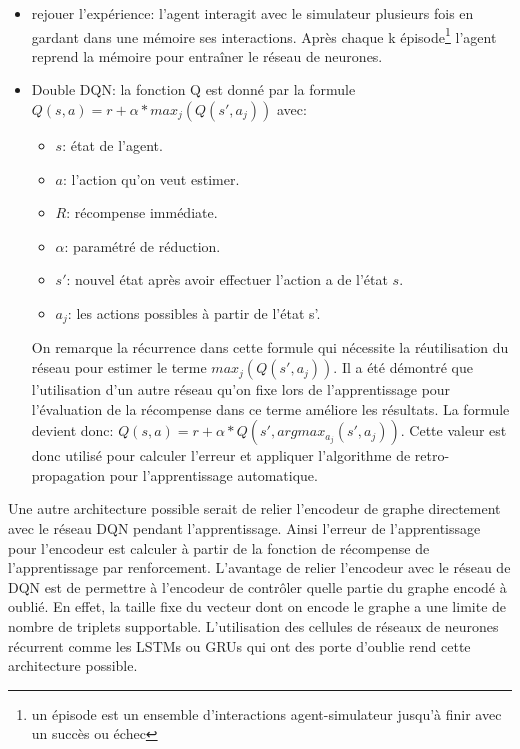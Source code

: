 \begin{itemize}
	\item rejouer l'expérience: l'agent interagit avec le simulateur plusieurs fois en gardant dans une mémoire ses interactions. Après chaque k épisode\footnote{un épisode est un ensemble d'interactions agent-simulateur jusqu'à finir avec un succès ou échec} l'agent reprend la mémoire pour entraîner le réseau de neurones.
	\item Double DQN: la fonction Q est donné par la formule $Q(s,a) = r + \alpha*max_j(Q(s',a_j))$ avec:
	\begin{itemize}
		\item $s$: état de l'agent.
		\item $a$: l'action qu'on veut estimer.
		\item $R$: récompense immédiate.
		\item $\alpha$: paramétré de réduction.
		\item $s'$: nouvel état après avoir effectuer l'action a de l'état $s$.
		\item $a_j$: les actions possibles à partir de l'état s'.
	\end{itemize}
	On remarque la récurrence dans cette formule qui nécessite la réutilisation du réseau pour estimer le terme $max_j (Q(s',a_j))$. Il a été démontré que l'utilisation d'un autre réseau qu'on fixe lors de l'apprentissage pour l'évaluation de la récompense dans ce terme améliore les résultats\cite{Mnih2015}. La formule devient donc: $Q(s,a) = r + \alpha*Q(s',argmax_{a_j}(s',a_j))$. Cette valeur est donc utilisé pour calculer l'erreur et appliquer l'algorithme de retro-propagation pour l'apprentissage automatique.
\end{itemize}
Une autre architecture possible serait de relier l'encodeur de graphe directement avec le réseau DQN pendant l'apprentissage. Ainsi l'erreur de l'apprentissage pour l'encodeur est calculer à partir de la fonction de récompense de l'apprentissage par renforcement. L'avantage de relier l'encodeur avec le réseau de DQN est de permettre à l'encodeur de contrôler quelle partie du graphe encodé à oublié. En effet, la taille fixe du vecteur dont on encode le graphe a une limite de nombre de triplets supportable. L'utilisation des cellules de réseaux de neurones récurrent comme les LSTMs ou GRUs qui ont des porte d'oublie rend cette architecture possible.
